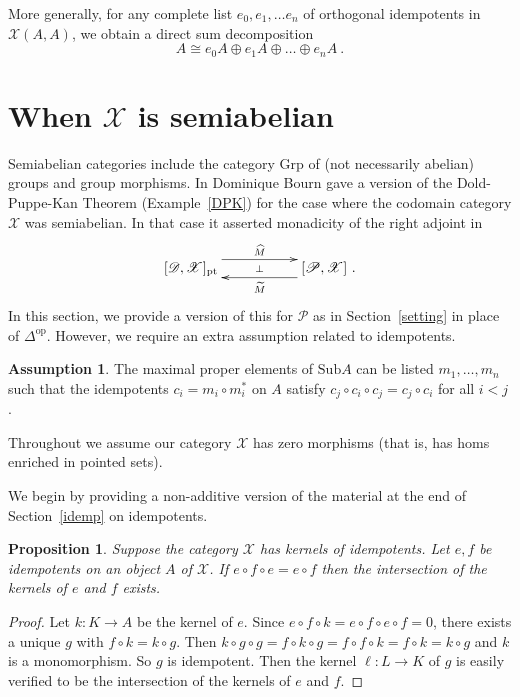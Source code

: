 \documentclass[a4paper,12pt,reqno]{amsart}
\newtheorem{proposition}[theorem]{Proposition}
\theoremstyle{definition}
\newtheorem{assumption}[theorem]{Assumption}
\theoremstyle{fact}
\theoremstyle{genquest}
\theoremstyle{step}
\newcommand{\ra}{\rightarrow}
\def\CD{{\mathscr D}}
\def\CP{{\mathscr P}}
\def\CX{{\mathscr X}}
\begin{document}
More generally, for any complete list $e_0, e_1, \dots e_n$ of orthogonal idempotents
in $\CX (A,A)$, we obtain a direct sum decomposition
$$A\cong e_0A \oplus e_1A \oplus \dots \oplus e_nA \ .$$ 

\section{When $\CX$ is semiabelian}\label{semiabelian}

Semiabelian categories include the category $\mathrm{Grp}$ of 
(not necessarily abelian) groups and group morphisms.
In \cite{Bourn07} Dominique Bourn gave a version of the Dold-Puppe-Kan Theorem (Example~\ref{DPK})
for the case where the codomain category $\CX$ was semiabelian.
In that case it asserted monadicity of the right adjoint in 
\begin{equation}\label{pttedkeradj} 
\xymatrix @R-3mm {
[\CD,\CX]_{\mathrm{pt}} \ar@<1.5ex>[rr]^{\widehat{M}} \ar@{}[rr]|-{\bot} && [\CP,\CX]
 \ar@<1.5ex>[ll]^{\widetilde{M}} \ .
}
\end{equation} 
In this section, we provide a version of this for $\CP$ as in Section~\ref{setting}
in place of $\Delta^{\mathrm{op}}$. However, we require an extra assumption related to
idempotents. 

\begin{assumption}\label{ass6}
The maximal proper elements of $\mathrm{Sub}A$ can be listed $m_1, \dots, m_n$ 
such that the idempotents $c_i = m_i \circ m_i^*$ on $A$ satisfy 
$c_j\circ c_i\circ c_j=c_j\circ c_i$ for all $i< j$. 
\end{assumption}

Throughout we assume our category $\CX$ has zero morphisms (that is, has homs enriched in pointed sets).

We begin by providing a non-additive version of the material at the end of Section~\ref{idemp} on idempotents. 

\begin{proposition}
Suppose the category $\CX$ has kernels of idempotents.
Let $e,f$ be idempotents on an object $A$ of $\CX$.
If $e\circ f\circ e = e\circ f$ then the intersection of the kernels of $e$ and $f$ exists.
\end{proposition}
\begin{proof}
Let $k:K\ra A$ be the kernel of $e$.
Since $e\circ f \circ k=e\circ f\circ e\circ f =0$, there exists a unique $g$ with 
$f\circ k=k\circ g$. Then $k\circ g\circ g = f\circ k\circ g=f\circ f \circ k=f\circ k=k\circ g$ and $k$ is a monomorphism. So $g$ is idempotent. Then the kernel $\ell :L\ra K$ of $g$ is easily verified to be the intersection of the kernels of $e$ and $f$.
\end{proof}
\end{document}
